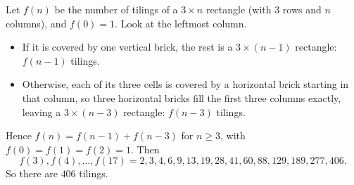 Let $f(n)$ be the number of tilings of a $3\times n$ rectangle (with $3$ rows and $n$ columns), and $f(0)=1$. Look at the leftmost column.
\begin{itemize}
\item If it is covered by one vertical brick, the rest is a $3\times(n-1)$ rectangle: $f(n-1)$ tilings.
\item Otherwise, each of its three cells is covered by a horizontal brick starting in that column, so three horizontal bricks fill the first three columns exactly, leaving a $3\times(n-3)$ rectangle: $f(n-3)$ tilings.
\end{itemize}
Hence $f(n)=f(n-1)+f(n-3)$ for $n\ge3$, with $f(0)=f(1)=f(2)=1$. Then
\[f(3),f(4),\dots,f(17)=2,3,4,6,9,13,19,28,41,60,88,129,189,277,406.\]
So there are $\boxed{406}$ tilings.
